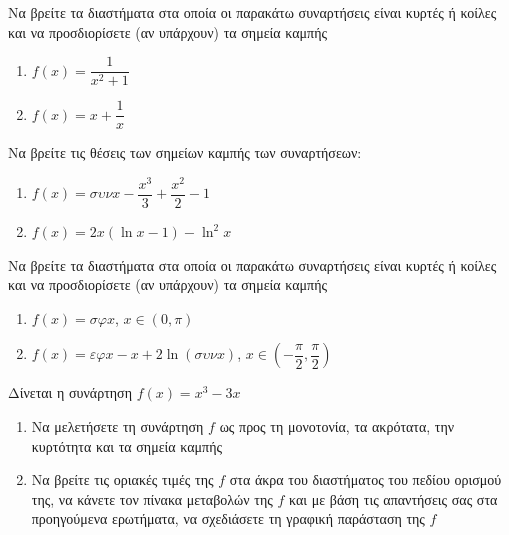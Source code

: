 \documentclass{presentation}
\begin{document}
\begin{askisi}
  Να βρείτε τα διαστήματα στα οποία οι παρακάτω συναρτήσεις είναι κυρτές ή κοίλες και να προσδιορίσετε (αν υπάρχουν) τα σημεία καμπής
  \begin{enumerate}
    \item<1-> $f(x)=\dfrac{1}{x^2+1}$
    \item<2-> $f(x)=x+\dfrac{1}{x}$
  \end{enumerate}

\end{askisi}

\begin{askisi}
  Να βρείτε τις θέσεις των σημείων καμπής των συναρτήσεων:
  \begin{enumerate}
    \item<1-> $f(x)=συνx-\dfrac{x^3}{3}+\dfrac{x^2}{2}-1$
    \item<2-> $f(x)=2x(\ln x-1)-\ln^2x$
  \end{enumerate}

\end{askisi}

\begin{askisi}
  Να βρείτε τα διαστήματα στα οποία οι παρακάτω συναρτήσεις είναι κυρτές ή κοίλες και να προσδιορίσετε (αν υπάρχουν) τα σημεία καμπής
  \begin{enumerate}
    \item<1-> $f(x)=σφx$, $x\in (0,\pi)$
    \item<2-> $f(x)=εφx-x+2\ln (συνx)$, $x\in (-\dfrac{\pi}{2},\dfrac{\pi}{2})$
  \end{enumerate}

\end{askisi}

\begin{askisi}
  Δίνεται η συνάρτηση $f(x)=x^3-3x$
  \begin{enumerate}
    \item<1-> Να μελετήσετε τη συνάρτηση $f$ ως προς τη μονοτονία, τα ακρότατα, την κυρτότητα και τα σημεία καμπής
    \item<2-> Να βρείτε τις οριακές τιμές της $f$ στα άκρα του διαστήματος του πεδίου ορισμού της, να κάνετε τον πίνακα μεταβολών της $f$ και με βάση τις απαντήσεις σας στα προηγούμενα ερωτήματα, να σχεδιάσετε τη γραφική παράσταση της $f$
  \end{enumerate}

\end{askisi}
\end{document}
